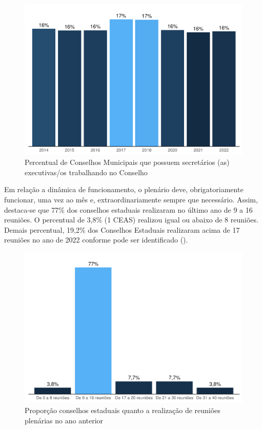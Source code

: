 \documentclass[
  brazilian]{report}
\begin{document}
\begin{figure}
\includegraphics{Censo-SUAS-2022_files/figure-latex/cmas_se-1} \caption[Percentual de Conselhos Municipais que possuem secretários (as) executivas/os trabalhando no Conselho]{Percentual de Conselhos Municipais que possuem secretários (as) executivas/os trabalhando no Conselho}\label{fig:cmas_se}
\end{figure}

Em relação a dinâmica de funcionamento, o plenário deve,
obrigatoriamente funcionar, uma vez ao mês e, extraordinariamente sempre
que necessário. Assim, destaca-se que 77\% dos conselhos estaduais
realizaram no último ano de 9 a 16 reuniões. O percentual de 3,8\% (1
CEAS) realizou igual ou abaixo de 8 reuniões. Demais percentual, 19,2\%
dos Conselhos Estaduais realizaram acima de 17 reuniões no ano de 2022
conforme pode ser identificado ().

\begin{figure}
\includegraphics{Censo-SUAS-2022_files/figure-latex/qtdceas_reuniao-1} \caption[Proporção conselhos estaduais quanto a realização de reuniões plenárias no ano anterior]{Proporção conselhos estaduais quanto a realização de reuniões plenárias no ano anterior}\label{fig:qtdceas_reuniao}
\end{figure}
\end{document}
